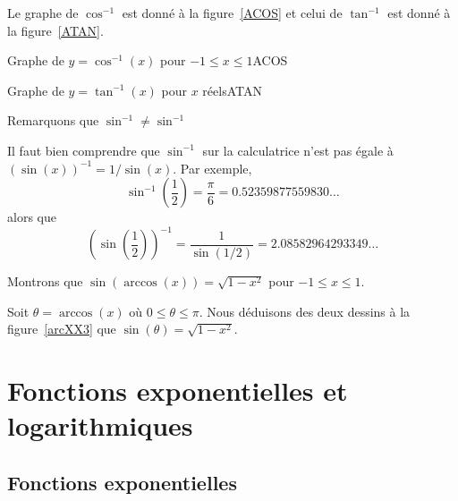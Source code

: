 {Le graphe de $\cos^{-1}$ est donné à la figure~\ref{ACOS} et celui de
$\tan^{-1}$ est donné à la figure~\ref{ATAN}.

{Graphe de $y=\cos^{-1}(x)$ pour $-1 \leq x \leq 1$}{ACOS}

{Graphe de $y=\tan^{-1}(x)$ pour $x$ réels}{ATAN}

\begin{rmk}
Remarquons que $\displaystyle \sin^{-1} \neq \sin^{-1}$

Il faut bien comprendre que $\sin^{-1}$ sur la calculatrice n'est pas
égale à $\left(\sin(x)\right)^{-1} = 1/\sin(x)$.  Par exemple,
\[
\sin^{-1}\left(\frac{1}{2}\right) = \frac{\pi}{6} = 0.52359877559830\ldots
\]
alors que
\[
\left(\sin\left(\frac{1}{2}\right)\right)^{-1}
= \frac{1}{\sin\left(1/2\right)} =
2.08582964293349\ldots
\]
\end{rmk}

\begin{egg}
Montrons que $\displaystyle \sin(\arccos(x)) = \sqrt{1-x^2}$ pour
$-1\leq x \leq 1$. 

Soit $\theta = \arccos(x)$ où $0 \leq \theta \leq \pi$.  Nous
déduisons des deux dessins à la figure~\ref{arcXX3} que
$\sin(\theta) = \sqrt{1-x^2}$.
\end{egg}




\section{Fonctions exponentielles et logarithmiques}

\subsection{Fonctions exponentielles}\label{cerclevicieux}

}
